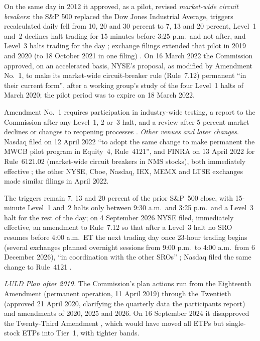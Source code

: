 \begin{qfrule}
On the same day in 2012 it approved, as a pilot, revised \emph{market-wide circuit breakers}: the S\&P 500 replaced the Dow Jones Industrial Average, triggers recalculated daily fell from 10, 20 and 30 percent to 7, 13 and 20 percent, Level~1 and~2 declines halt trading for 15 minutes before 3:25 p.m.\ and not after, and Level~3 halts trading for the day \citep[Release 34-67090]{sec-34-67090}; exchange filings extended that pilot in 2019 and 2020 (to 18 October 2021 in one filing) \citep[MEMX filing, sec.~II.A.1]{sec-fr-2020-23011}. On 16 March 2022 the Commission approved, on an accelerated basis, NYSE's proposal, as modified by Amendment No.~1, to make its market-wide circuit-breaker rule (Rule~7.12) permanent ``in their current form'', after a working group's study of the four Level~1 halts of March 2020; the pilot period was to expire on 18 March 2022.

Amendment No.~1 requires participation in industry-wide testing, a report to the Commission after any Level~1, 2 or~3 halt, and a review after 5 percent market declines or changes to reopening processes \citep[Release 34-94441, pp.~16286--16296]{sec-34-94441}. \emph{Other venues and later changes}. Nasdaq filed on 12 April 2022 ``to adopt the same change to make permanent the MWCB pilot program in Equity~4, Rule~4121'', and FINRA on 13 April 2022 for Rule~6121.02 (market-wide circuit breakers in NMS stocks), both immediately effective \citep[87~FR 23296 and 23291]{fr-2022-mwcb-permanent}; the other NYSE, Cboe, Nasdaq, IEX, MEMX and LTSE exchanges made similar filings in April 2022.

The triggers remain 7, 13 and 20 percent of the prior S\&P~500 close, with 15-minute Level~1 and~2 halts only between 9:30 a.m.\ and 3:25 p.m.\ and a Level~3 halt for the rest of the day; on 4 September 2026 NYSE filed, immediately effective, an amendment to Rule~7.12 so that after a Level~3 halt no SRO resumes before 4:00 a.m.\ ET the next trading day once 23-hour trading begins (several exchanges planned overnight sessions from 9:00 p.m.\ to 4:00 a.m.\ from 6 December 2026), ``in coordination with the other SROs'' \citep[91~FR 59278]{fr-2026-19125}; Nasdaq filed the same change to Rule~4121 \citep[91~FR 64439]{fr-2026-20605}.

\emph{LULD Plan after 2019.} The Commission's plan actions run from the Eighteenth Amendment (permanent operation, 11 April 2019) through the Twentieth (approved 21 April 2020, clarifying the quarterly data the participants report) and amendments of 2020, 2025 and 2026. On 16 September 2024 it disapproved the Twenty-Third Amendment \citep[89~FR 77203]{fr-2024-21508}, which would have moved all ETPs but single-stock ETPs into Tier~1, with tighter bands.


\end{qfrule}
